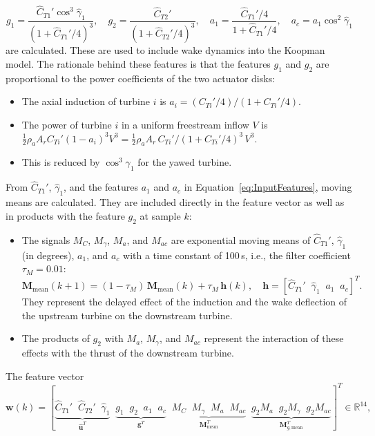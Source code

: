 \begin{equation} \label{eq:InputFeatures}
    g_1 = \frac{\hat{C}_{T1}'\cos^3\hat{\gamma}_1}{(1 + \hat{C}_{T1}'/4)^3}, \quad g_2 = \frac{\hat{C}_{T2}'}{(1 + \hat{C}_{T2}'/4)^3}, \quad a_1 = \frac{\hat{C}_{T1}'/4}{1 + \hat{C}_{T1}'/4}, \quad a_c = a_1\cos^2\hat{\gamma}_1
\end{equation}
are calculated.
%
These are used to include wake dynamics into the Koopman model. The rationale behind these features is that the features $g_1$ and $g_2$ are proportional to the power coefficients of the two actuator disks:
\begin{itemize}
    \item The axial induction of turbine $i$ is $a_i = (C_{Ti}'/4)/(1+C_{Ti}'/4)$.
    \item The power of turbine $i$ in a uniform freestream inflow $V$ is $\frac{1}{2}\rho_a A_r C_{Ti}' (1-a_i)^3 V^3 = \frac{1}{2}\rho_a A_r\, C_{Ti}'/(1+C_{Ti}'/4)^3\, V^3$.
    \item This is reduced by $\cos^3\gamma_1$ for the yawed turbine.
\end{itemize}
From $\hat{C}_{T1}'$, $\hat{\gamma}_1$, and the features $a_1$ and $a_c$ in Equation~\eqref{eq:InputFeatures}, moving means are calculated. They are included directly in the feature vector as well as in products with the feature $g_2$ at sample $k$:
\begin{itemize}
    \item The signals $M_{C}$, $M_{\gamma}$, $M_{a}$, and $M_{ac}$ are exponential moving means of $\hat{C}_{T1}'$, $\hat{\gamma}_1$ (in degrees), $a_1$, and $a_c$ with a time constant of 100\,s, i.e., the filter coefficient $\tau_M = 0.01$:
    \begin{equation} \label{eq:MovingMeans}
        \bm{M}_{\text{mean}}(k+1) = (1 - \tau_M)\, \bm{M}_{\text{mean}}(k) + \tau_M\,\bm{h}(k), \quad \bm{h} = [\hat{C}_{T1}' \;\; \hat{\gamma}_1 \;\; a_1 \;\; a_c]^T.
    \end{equation}
    They represent the delayed effect of the induction and the wake deflection of the upstream turbine on the downstream turbine.
    \item The products of $g_2$ with $M_{a}$, $M_{\gamma}$, and $M_{ac}$ represent the interaction of these effects with the thrust of the downstream turbine.
\end{itemize}
%
The feature vector
\begin{equation} \label{eq:wFeatWRC}
    \bm{w}(k) = [\underbrace{\hat{C}_{T1}' \;\; \hat{C}_{T2}' \;\; \hat{\gamma}_1}_{\hat{\bm{u}}^T} \;\; \underbrace{g_1 \;\; g_2\;\; a_1\;\; a_c}_{\bm{g}^T} \;\; \underbrace{M_{C} \;\; M_{\gamma} \;\; M_{a} \;\; M_{ac}}_{\bm{M}_{\text{mean}}^T} \;\; \underbrace{g_2 M_{a} \;\; g_2 M_{\gamma} \;\; g_2 M_{ac}}_{\bm{M}_{g,\text{mean}}^T}]^T \in \mathbb{R}^{14},
\end{equation}
